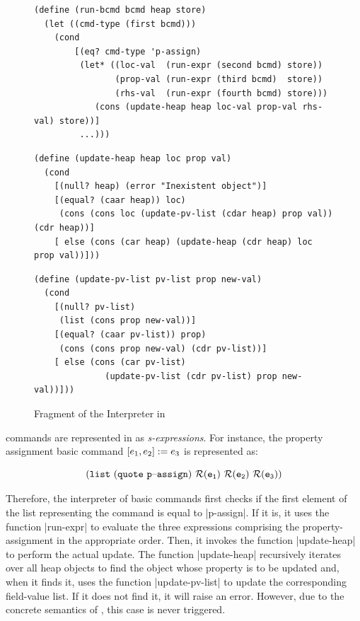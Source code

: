 \lstset{language=Scheme, numbers = left}

\begin{figure}[t!]
\centering
\begin{lstlisting}
(define (run-bcmd bcmd heap store)
  (let ((cmd-type (first bcmd)))
    (cond
    	[(eq? cmd-type 'p-assign)
      	 (let* ((loc-val  (run-expr (second bcmd) store))
                (prop-val (run-expr (third bcmd)  store))
                (rhs-val  (run-expr (fourth bcmd) store)))
            (cons (update-heap heap loc-val prop-val rhs-val) store))]
         ...)))
\end{lstlisting}

\begin{lstlisting}
(define (update-heap heap loc prop val)
  (cond
    [(null? heap) (error "Inexistent object")]
    [(equal? (caar heap)) loc)
     (cons (cons loc (update-pv-list (cdar heap) prop val)) (cdr heap))]
    [ else (cons (car heap) (update-heap (cdr heap) loc prop val))]))
\end{lstlisting}

\begin{lstlisting}         
(define (update-pv-list pv-list prop new-val)
  (cond
    [(null? pv-list)
     (list (cons prop new-val))]
    [(equal? (caar pv-list)) prop)
     (cons (cons prop new-val) (cdr pv-list))]
    [ else (cons (car pv-list) 
              (update-pv-list (cdr pv-list) prop new-val))]))
\end{lstlisting}
\vspace*{-0.3cm}
\caption{Fragment of the \jsil Interpreter in \rosette}\label{rosette:interpreter:fragment}
\vspace*{-0.5cm}
\end{figure}


\jsil commands are represented in \rosette as \emph{s-expressions}. 
 For instance, the property assignment basic command $[e_1, e_2] := e_3$
 is represented as: 

\vspace*{-0.2cm}
{\small $$
\mathtt{(list \ (quote\ {p\text{--}assign}) \ \roscomp{\jsilexpr_1} \ \roscomp{\jsilexpr_2} \ \roscomp{\jsilexpr_3})}
$$}
\vspace*{-0.4cm}

\noindent Therefore, the interpreter of basic commands first checks if the first element of the 
list representing the command is equal to \schemeinline|p-assign|. If it is, 
it uses the function \schemeinline|run-expr| to evaluate the three \jsil expressions 
comprising the property-assignment in the appropriate order. Then, it invokes the 
function \schemeinline|update-heap| to perform the actual update. 
The function \schemeinline|update-heap| recursively iterates over all heap objects
to find the object whose property is to be updated and, when it finds it, 
uses the function \schemeinline|update-pv-list| to update the corresponding 
field-value list. If it does not find it, it will raise an error. However, due to the concrete semantics of \jsil, this case is never triggered.




